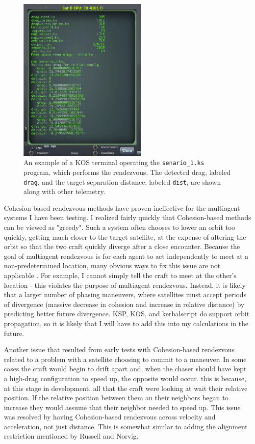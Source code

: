 \documentclass[journal,a4paper,12pt]{IEEEtran}
\begin{document}
\begin{figure}[h!]
  \centering
  \includegraphics[width=2.5in]{img/kosterm}
  \caption{An example of a KOS terminal operating the \texttt{senario\_1.ks} program,
  which performs the rendezvous. The detected drag, labeled \texttt{drag}, and the
  target separation distance, labeled \texttt{dist}, are shown along with other telemetry.}
  \label{kos}
\end{figure}

Cohesion-based rendezvous methods have proven ineffective for the
multiagent systems I have been testing. I realized fairly quickly that Cohesion-based
methods can be viewed as "greedy". Such a system often chooses to lower an orbit
too quickly, getting much closer to the target satellite, at the expense of altering
the orbit so that the two craft quickly diverge after a close encounter. Because
the goal of multiagent rendezvous is for each agent to act independently
to meet at a non-predetermined location, many obvious ways to fix this issue are
not applicable \cite{lin_multi}. For example, I cannot simply tell the craft to meet
at the other's location - this violates the purpose of multiagent rendezvous. Instead,
it is likely that a larger number of phasing maneuvers, where satellites must accept
periods of divergence (massive decrease in cohesion and increase in relative distance)
by predicting better future divergence. KSP, KOS, and kerbalscript do support orbit
propagation, so it is likely that I will have to add this into my calculations in
the future.

Another issue that resulted from early tests with Cohesion-based rendezvous related
to a problem with a satellite choosing to commit to a maneuver. In some cases the
craft would begin to drift apart and, when the chaser should have kept a high-drag
configuration to speed up, the opposite would occur. this is because, at this stage
in development, all that the craft were looking at wait their relative position. If
the relative position between them an their neighbors began to increase they would
assume that their neighbor needed to speed up. This issue was resolved by having
Cohesion-based rendezvous across velocity and acceleration, not just distance. This
is somewhat similar to adding the alignment restriction mentioned by Russell and
Norvig.
\end{document}
